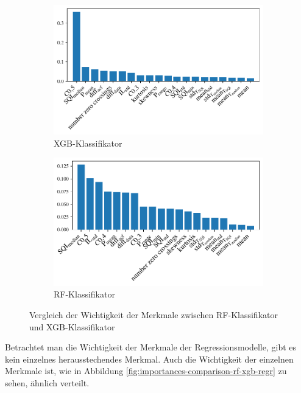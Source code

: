  \begin{figure}[h]
 	\centering
		\begin{subfigure}{.495\textwidth}
			\centering
 			\includegraphics[width=\textwidth]{pic/xgb-clf-reduced-importances.pdf}
 			\caption{\ac{XGB}-Klassifikator}
 		\end{subfigure}
    	\begin{subfigure}{.495\textwidth}
    		\centering
 			\includegraphics[width=\textwidth]{pic/rf-clf-reduced-importances.pdf}
 			\caption{\ac{RF}-Klassifikator}
 		\end{subfigure}
 	\caption{Vergleich der Wichtigkeit der Merkmale zwischen \ac{RF}-Klassifikator und \ac{XGB}-Klassifikator}
 	\label{fig:importances-comparison-rf-xgb-clf}
 \end{figure}

Betrachtet man die Wichtigkeit der Merkmale der Regressionsmodelle, gibt es kein einzelnes herausstechendes Merkmal. Auch die Wichtigkeit der einzelnen Merkmale ist, wie in Abbildung \ref{fig:importances-comparison-rf-xgb-regr} zu sehen, ähnlich verteilt.

